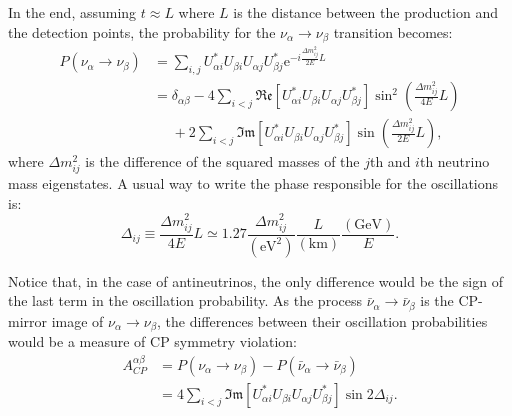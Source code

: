 In the end, assuming $t \approx L$ where $L$ is the distance between the production and the detection points, the probability for the $\nu_{\alpha} \rightarrow \nu_{\beta}$ transition becomes:
\begin{equation}
\begin{split}
P(\nu_{\alpha} \rightarrow \nu_{\beta}) &= \sum_{i,j} U^{*}_{\alpha i} U_{\beta i} U_{\alpha j} U^{*}_{\beta j} \mathrm{e}^{-i\frac{\Delta m^{2}_{ij}}{2E}L}\\
&=\delta_{\alpha\beta} - 4 \sum_{i<j} \mathfrak{Re}\left[U^{*}_{\alpha i} U_{\beta i} U_{\alpha j} U^{*}_{\beta j}\right] \sin^{2}\left(\frac{\Delta m^{2}_{ij}}{4E}L\right)\\
&\phantom{=}+ 2  \sum_{i<j} \mathfrak{Im}\left[U^{*}_{\alpha i} U_{\beta i} U_{\alpha j} U^{*}_{\beta j}\right] \sin\left(\frac{\Delta m^{2}_{ij}}{2E}L\right),
\end{split}
\end{equation}
where $\Delta m^{2}_{ij}$ is the difference of the squared masses of the $j$th and $i$th neutrino mass eigenstates. A usual way to write the phase responsible for the oscillations is:
\begin{equation}\label{eq:oscillation_term}
\Delta_{ij} \equiv \frac{\Delta m^{2}_{ij}}{4E}L \simeq 1.27 \frac{\Delta m^{2}_{ij}}{(\mathrm{eV}^{2})} \frac{L}{(\mathrm{km})} \frac{(\mathrm{GeV})}{E}.
\end{equation}

Notice that, in the case of antineutrinos, the only difference would be the sign of the last term in the oscillation probability. As the process $\bar{\nu}_{\alpha} \rightarrow \bar{\nu}_{\beta}$ is the CP-mirror image of $\nu_{\alpha} \rightarrow \nu_{\beta}$, the differences between their oscillation probabilities would be a measure of CP symmetry violation:
\begin{equation}\label{eq:cp_asymmetry}
\begin{split}
A^{\alpha\beta}_{CP}&=P(\nu_{\alpha} \rightarrow \nu_{\beta})-P(\bar{\nu}_{\alpha} \rightarrow \bar{\nu}_{\beta})\\
&=4  \sum_{i<j} \mathfrak{Im}\left[U^{*}_{\alpha i} U_{\beta i} U_{\alpha j} U^{*}_{\beta j}\right] \sin 2\Delta_{ij}.
\end{split}
\end{equation}

